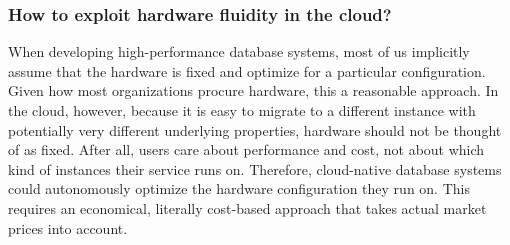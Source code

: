 \documentclass[11pt]{article}
\begin{document}
\subsubsection*{How to exploit hardware fluidity in the cloud?}

When developing high-performance database systems, most of us implicitly assume that the hardware is fixed and optimize for a particular configuration.
Given how most organizations procure hardware, this a reasonable approach.
In the cloud, however, because it is easy to migrate to a different instance with potentially very different underlying properties, hardware should not be thought of as fixed.
After all, users care about performance and cost, not about which kind of instances their service runs on.
Therefore, cloud-native database systems could autonomously optimize the hardware configuration they run on.
This requires an economical, literally cost-based approach that takes actual market prices into account.

\end{document}

